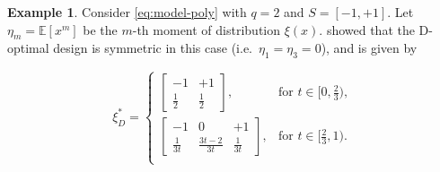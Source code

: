 \documentclass[
]{book}
\theoremstyle{definition}
\theoremstyle{definition}
\newtheorem{example}{Example}[chapter]
\theoremstyle{definition}
\theoremstyle{definition}
\theoremstyle{remark}
\begin{document}
\begin{example}
\protect\hypertarget{exm:poly2}{}\label{exm:poly2}Consider \eqref{eq:model-poly} with \(q=2\) and \(S=[-1,+1]\). Let \(\eta_m=\mathbb{E}[x^m]\) be the \(m\)-th moment of distribution \(\xi(x)\). \citet{gao2014new} showed that the D-optimal design is symmetric in this case (i.e.~\(\eta_1=\eta_3=0\)), and is given by

\begin{equation*} 
\xi_D^* = \begin{cases} 
    \begin{bmatrix}
    -1          &   +1\\
    \frac{1}{2} &   \frac{1}{2}
    \end{bmatrix},      & \mbox{for $t\in [0,\frac{2}{3})$}, \\
    \begin{bmatrix}
    -1           &  0       &+1\\
    \frac{1}{3t} &\frac{3t-2}{3t}           &\frac{1}{3t}
    \end{bmatrix},                                  & \mbox{for $t\in [\frac{2}{3},1)$}.\\
\end{cases}
\end{equation*}


\end{example}
\end{document}
